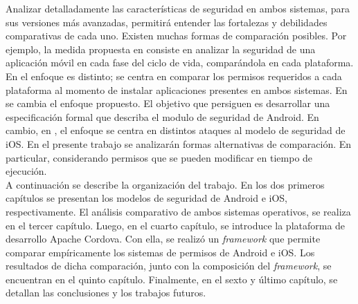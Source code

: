Analizar detalladamente las características de seguridad en ambos sistemas, para sus versiones más avanzadas, permitirá entender las fortalezas y debilidades comparativas de cada uno. Existen muchas formas de comparación posibles. Por ejemplo, la medida propuesta en \cite{YA2014} consiste en analizar la seguridad de una aplicación móvil en cada fase del ciclo de vida, comparándola en cada plataforma. En \cite{HYGZD2014} el enfoque es distinto; se centra en comparar los permisos requeridos a cada plataforma al momento de instalar aplicaciones presentes en ambos sistemas. En \cite{Gor16, BCLR15, Rom14} se cambia el enfoque propuesto. El objetivo que persiguen es desarrollar una especificación formal que describa el modulo de seguridad de Android. En cambio, en \cite{TZSH13}, el enfoque se centra en distintos ataques al modelo de seguridad de iOS. En el presente trabajo se analizarán formas alternativas de comparación. En particular, considerando permisos que se pueden modificar en tiempo de ejecución.\\

A continuación se describe la organización del trabajo. En los dos primeros capítulos se presentan los modelos de seguridad de Android e iOS, respectivamente. El análisis comparativo de ambos sistemas operativos, se realiza en el tercer capítulo. Luego, en el cuarto capítulo, se introduce la plataforma de desarrollo Apache Cordova. Con ella, se realizó un \emph{framework} que permite comparar empíricamente los sistemas de permisos de Android e iOS. Los resultados de dicha comparación, junto con la composición del \emph{framework}, se encuentran en el quinto capítulo. Finalmente, en el sexto y último capítulo, se detallan las conclusiones y los trabajos futuros.